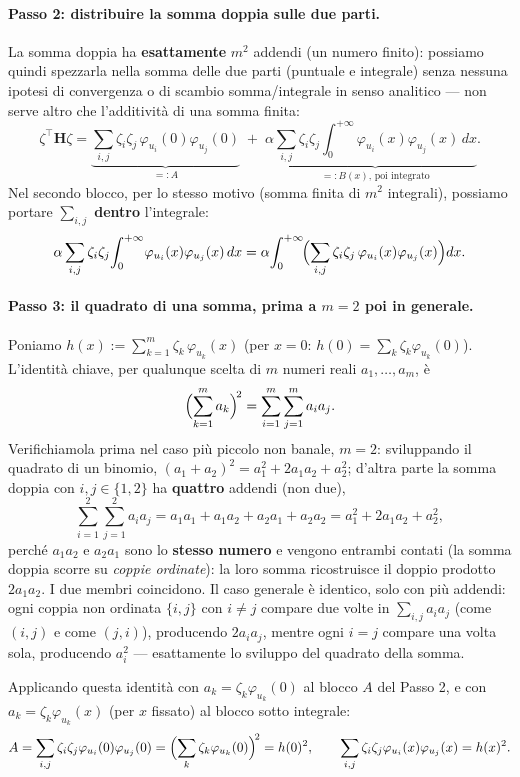\documentclass[11pt,a4paper]{article}
\theoremstyle{plain}
\theoremstyle{definition}
\theoremstyle{remark}
\newcommand{\Hmat}{\mathbf{H}}
\newcommand{\transp}{^{\!\top}}
\begin{document}
\paragraph{Passo 2: distribuire la somma doppia sulle due parti.} La somma doppia ha
\textbf{esattamente} $m^2$ addendi (un numero finito): possiamo quindi spezzarla nella somma
delle due parti (puntuale e integrale) senza nessuna ipotesi di convergenza o di scambio
somma/integrale in senso analitico --- non serve altro che l'additività di una somma finita:
\[
  \zeta\transp\Hmat\zeta
  = \underbrace{\sum_{i,j}\zeta_i\zeta_j\,\varphi_{u_i}(0)\varphi_{u_j}(0)}_{=:A}
  \;+\; \alpha\underbrace{\sum_{i,j}\zeta_i\zeta_j\!\int_0^{+\infty}\!\varphi_{u_i}(x)\varphi_{u_j}(x)\,dx}_{=:B(x)\text{, poi integrato}} .
\]
Nel secondo blocco, per lo stesso motivo (somma finita di $m^2$ integrali), possiamo portare
$\sum_{i,j}$ \textbf{dentro} l'integrale:
\[
  \alpha\sum_{i,j}\zeta_i\zeta_j\!\int_0^{+\infty}\!\varphi_{u_i}(x)\varphi_{u_j}(x)\,dx
  = \alpha\!\int_0^{+\infty}\!\Bigl(\sum_{i,j}\zeta_i\zeta_j\,\varphi_{u_i}(x)\varphi_{u_j}(x)\Bigr)dx .
\]

\paragraph{Passo 3: il quadrato di una somma, prima a $m=2$ poi in generale.} Poniamo
$h(x):=\sum_{k=1}^m \zeta_k\,\varphi_{u_k}(x)$ (per $x=0$: $h(0)=\sum_k\zeta_k\varphi_{u_k}(0)$).
L'identità chiave, per qualunque scelta di $m$ numeri reali $a_1,\ldots,a_m$, è
\[
  \Bigl(\sum_{k=1}^m a_k\Bigr)^{\!2} = \sum_{i=1}^m\sum_{j=1}^m a_i a_j .
\]
Verifichiamola prima nel caso più piccolo non banale, $m=2$: sviluppando il quadrato di un
binomio, $(a_1+a_2)^2 = a_1^2+2a_1a_2+a_2^2$; d'altra parte la somma doppia con $i,j\in\{1,2\}$
ha \textbf{quattro} addendi (non due),
\[
  \sum_{i=1}^2\sum_{j=1}^2 a_ia_j = a_1a_1+a_1a_2+a_2a_1+a_2a_2 = a_1^2+2a_1a_2+a_2^2,
\]
perché $a_1a_2$ e $a_2a_1$ sono lo \textbf{stesso numero} e vengono entrambi contati (la somma
doppia scorre su \emph{coppie ordinate}): la loro somma ricostruisce il doppio prodotto
$2a_1a_2$. I due membri coincidono. Il caso generale è identico, solo con più addendi: ogni
coppia non ordinata $\{i,j\}$ con $i\neq j$ compare due volte in $\sum_{i,j}a_ia_j$ (come
$(i,j)$ e come $(j,i)$), producendo $2a_ia_j$, mentre ogni $i=j$ compare una volta sola,
producendo $a_i^2$ --- esattamente lo sviluppo del quadrato della somma.

Applicando questa identità con $a_k=\zeta_k\varphi_{u_k}(0)$ al blocco $A$ del Passo 2, e con
$a_k=\zeta_k\varphi_{u_k}(x)$ (per $x$ fissato) al blocco sotto integrale:
\[
  A = \sum_{i,j}\zeta_i\zeta_j\varphi_{u_i}(0)\varphi_{u_j}(0)
    = \Bigl(\sum_k \zeta_k\varphi_{u_k}(0)\Bigr)^{\!2} = h(0)^2,
  \qquad
  \sum_{i,j}\zeta_i\zeta_j\varphi_{u_i}(x)\varphi_{u_j}(x) = h(x)^2 .
\]
\end{document}
